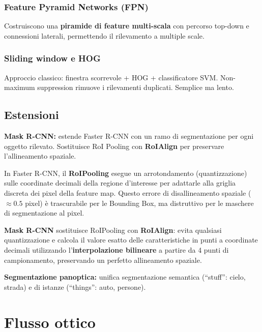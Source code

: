 \documentclass[12pt, a4paper]{report}
\begin{document}
\subsection{Feature Pyramid Networks (FPN)}

Costruiscono una \textbf{piramide di feature multi-scala} con percorso top-down
e connessioni laterali, permettendo il rilevamento a multiple scale.

\subsection{Sliding window e HOG}

Approccio classico: finestra scorrevole + HOG + classificatore SVM.
Non-maximum suppression rimuove i rilevamenti duplicati. Semplice ma lento.

\section{Estensioni}

\textbf{Mask R-CNN:} estende Faster R-CNN con un ramo di segmentazione per ogni
oggetto rilevato. Sostituisce RoI Pooling con \textbf{RoIAlign} per preservare
l'allineamento spaziale.

\begin{notebox}
In Faster R-CNN, il \textbf{RoIPooling} esegue un arrotondamento (quantizzazione) sulle coordinate decimali della regione d'interesse per adattarle alla griglia discreta dei pixel della feature map. Questo errore di disallineamento spaziale ($\approx 0.5$ pixel) è trascurabile per le Bounding Box, ma distruttivo per le maschere di segmentazione al pixel.

\textbf{Mask R-CNN} sostituisce RoIPooling con \textbf{RoIAlign}: evita qualsiasi quantizzazione e calcola il valore esatto delle caratteristiche in punti a coordinate decimali utilizzando l'\textbf{interpolazione bilineare} a partire da 4 punti di campionamento, preservando un perfetto allineamento spaziale.
\end{notebox}

\textbf{Segmentazione panoptica:} unifica segmentazione semantica (``stuff'':
cielo, strada) e di istanze (``things'': auto, persone).

\chapter{Flusso ottico}
\end{document}

